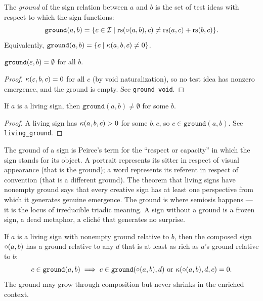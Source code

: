 \begin{definition}[Ground]
\label{def:ground}
The \emph{ground} of the sign relation between $a$ and $b$ is
the set of test ideas with respect to which the sign functions:
\[
  \texttt{ground}(a, b) = \{c \in \mathcal{I} \mid \mathrm{rs}(\circ(a, b), c)
  \neq \mathrm{rs}(a, c) + \mathrm{rs}(b, c)\}.
\]
Equivalently, $\texttt{ground}(a, b) = \{c \mid \kappa(a, b, c) \neq 0\}$.
\end{definition}

\begin{theorem}
\label{thm:ground-void}
$\texttt{ground}(\varepsilon, b) = \emptyset$ for all $b$.
\end{theorem}

\begin{proof}
$\kappa(\varepsilon, b, c) = 0$ for all $c$ (by void naturalization), so
no test idea has nonzero emergence, and the ground is empty. See
\texttt{ground\_void}.
\end{proof}

\begin{theorem}
\label{thm:living-ground}
If $a$ is a living sign, then $\texttt{ground}(a, b) \neq \emptyset$
for some $b$.
\end{theorem}

\begin{proof}
A living sign has $\kappa(a, b, c) > 0$ for some $b, c$, so
$c \in \texttt{ground}(a, b)$. See \texttt{living\_ground}.
\end{proof}

\begin{interpretation}
The ground of a sign is Peirce's term for the ``respect or capacity''
in which the sign stands for its object. A portrait represents its
sitter in respect of visual appearance (that is the ground); a word
represents its referent in respect of convention (that is a different
ground). The theorem that living signs have nonempty ground says that
every creative sign has at least one perspective from which it
generates genuine emergence. The ground is where semiosis happens
--- it is the locus of irreducible triadic meaning. A sign without
a ground is a frozen sign, a dead metaphor, a clich\'e that generates
no surprise.
\end{interpretation}

\begin{theorem}
\label{thm:ground-monotone}
If $a$ is a living sign with nonempty ground relative to $b$, then the composed sign $\circ(a, b)$ has a ground relative to any $d$ that is at least as rich as $a$'s ground relative to $b$:
\[
  c \in \texttt{ground}(a, b) \implies c \in \texttt{ground}(\circ(a, b), d) \text{ or } \kappa(\circ(a,b), d, c) = 0.
\]
The ground may grow through composition but never shrinks in the enriched context.
\end{theorem}

